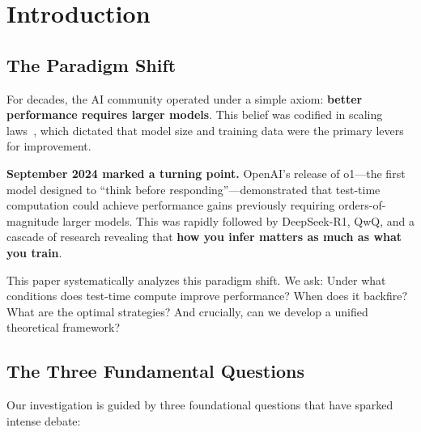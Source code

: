 \documentclass[10pt,preprint]{neurips_2024}
\begin{document}
\begin{abstract}
Our work provides definitive answers to three major controversies: (1) \textit{Can TTS replace pre-training?} \textbf{No}---only for low-to-medium difficulty tasks; (2) \textit{Is more compute always better?} \textbf{No}---overthinking is empirically verified; (3) \textit{What is the optimal TTS strategy?} \textbf{Difficulty-adaptive with verifier integration}---not fixed-budget or verifier-less approaches.

We conclude with a roadmap for future research, identifying critical open problems in multi-modal TTS, theoretical foundations, and deployment safety.
\end{abstract}

\section{Introduction}

\subsection{The Paradigm Shift}

For decades, the AI community operated under a simple axiom: \textbf{better performance requires larger models}. This belief was codified in scaling laws~\cite{kaplan2020scaling, hoffmann2022training}, which dictated that model size and training data were the primary levers for improvement.

\textbf{September 2024 marked a turning point.} OpenAI's release of o1---the first model designed to ``think before responding''---demonstrated that test-time computation could achieve performance gains previously requiring orders-of-magnitude larger models. This was rapidly followed by DeepSeek-R1, QwQ, and a cascade of research revealing that \textbf{how you infer matters as much as what you train}.

This paper systematically analyzes this paradigm shift. We ask: Under what conditions does test-time compute improve performance? When does it backfire? What are the optimal strategies? And crucially, can we develop a unified theoretical framework?

\subsection{The Three Fundamental Questions}

Our investigation is guided by three foundational questions that have sparked intense debate:
\end{document}
